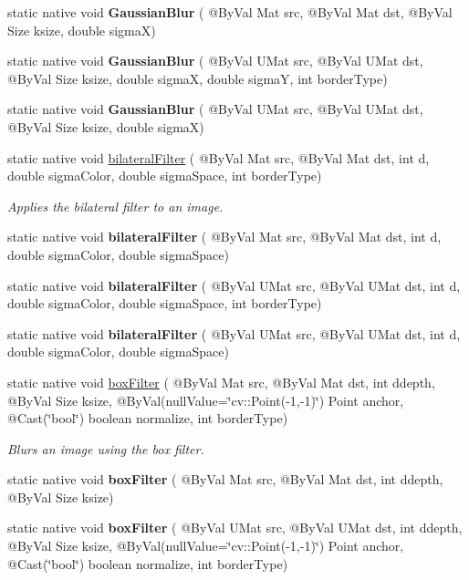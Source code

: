 \begin{DoxyCompactItemize}
static native void {\bfseries Gaussian\+Blur} ( @By\+Val Mat src, @By\+Val Mat dst, @By\+Val Size ksize, double sigmaX)
\item 
static native void {\bfseries Gaussian\+Blur} ( @By\+Val U\+Mat src, @By\+Val U\+Mat dst, @By\+Val Size ksize, double sigmaX, double sigmaY, int border\+Type)
\item 
static native void {\bfseries Gaussian\+Blur} ( @By\+Val U\+Mat src, @By\+Val U\+Mat dst, @By\+Val Size ksize, double sigmaX)
\item 
static native void \hyperlink{group__imgproc__filter_ga15d81db5deb10dd5c7f6ff4b6193a644}{bilateral\+Filter} ( @By\+Val Mat src, @By\+Val Mat dst, int d, double sigma\+Color, double sigma\+Space, int border\+Type)
\begin{DoxyCompactList}\small\item\em Applies the bilateral filter to an image. \end{DoxyCompactList}\item 
static native void {\bfseries bilateral\+Filter} ( @By\+Val Mat src, @By\+Val Mat dst, int d, double sigma\+Color, double sigma\+Space)
\item 
static native void {\bfseries bilateral\+Filter} ( @By\+Val U\+Mat src, @By\+Val U\+Mat dst, int d, double sigma\+Color, double sigma\+Space, int border\+Type)
\item 
static native void {\bfseries bilateral\+Filter} ( @By\+Val U\+Mat src, @By\+Val U\+Mat dst, int d, double sigma\+Color, double sigma\+Space)
\item 
static native void \hyperlink{group__imgproc__filter_ga479aa13dd62a69ab5b1a1eac3324ab23}{box\+Filter} ( @By\+Val Mat src, @By\+Val Mat dst, int ddepth, @By\+Val Size ksize, @By\+Val(null\+Value=\char`\"{}cv\+::\+Point(-\/1,-\/1)\char`\"{}) Point anchor, @Cast(\char`\"{}bool\char`\"{}) boolean normalize, int border\+Type)
\begin{DoxyCompactList}\small\item\em Blurs an image using the box filter. \end{DoxyCompactList}\item 
static native void {\bfseries box\+Filter} ( @By\+Val Mat src, @By\+Val Mat dst, int ddepth, @By\+Val Size ksize)
\item 
static native void {\bfseries box\+Filter} ( @By\+Val U\+Mat src, @By\+Val U\+Mat dst, int ddepth, @By\+Val Size ksize, @By\+Val(null\+Value=\char`\"{}cv\+::\+Point(-\/1,-\/1)\char`\"{}) Point anchor, @Cast(\char`\"{}bool\char`\"{}) boolean normalize, int border\+Type)

\end{DoxyCompactItemize}
